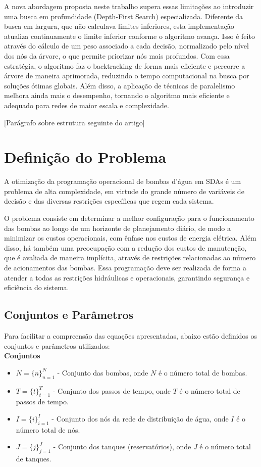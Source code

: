 \documentclass[12pt,a4paper,oneside,linenumbers=off,latinmodern=off,timesnews=off,english,spanish]{rctart-class/rctart}
\begin{document}
A nova abordagem proposta neste trabalho supera essas limitações ao introduzir uma busca em profundidade (Depth-First Search) especializada. Diferente da busca em largura, que não calculava limites inferiores, esta implementação atualiza continuamente o limite inferior conforme o algoritmo avança. Isso é feito através do cálculo de um peso associado a cada decisão, normalizado pelo nível dos nós da árvore, o que permite priorizar nós mais profundos. Com essa estratégia, o algoritmo faz o backtracking de forma mais eficiente e percorre a árvore de maneira aprimorada, reduzindo o tempo computacional na busca por soluções ótimas globais. Além disso, a aplicação de técnicas de paralelismo melhora ainda mais o desempenho, tornando o algoritmo mais eficiente e adequado para redes de maior escala e complexidade.

[Parágrafo sobre estrutura seguinte do artigo]


\section{Definição do Problema}

A otimização da programação operacional de bombas d'água em SDAs é um problema de alta complexidade, em virtude do grande número de variáveis de decisão e das diversas restrições específicas que regem cada sistema.

O problema consiste em determinar a melhor configuração para o funcionamento das bombas ao longo de um horizonte de planejamento diário, de modo a minimizar os custos operacionais, com ênfase nos custos de energia elétrica. Além disso, há também uma preocupação com a redução dos custos de manutenção, que é avaliada de maneira implícita, através de restrições relacionadas ao número de acionamentos das bombas. Essa programação deve ser realizada de forma a atender a todas as restrições hidráulicas e operacionais, garantindo segurança e eficiência do sistema.

\subsection{Conjuntos e Parâmetros}

Para facilitar a compreensão das equações apresentadas, abaixo estão definidos os conjuntos e parâmetros utilizados:
\\


\textbf{Conjuntos}
\begin{itemize}
    \item \( N = \{n\}_{n=1}^{N} \) - Conjunto das bombas, onde \(N\) é o número total de bombas.
    \item \( T = \{t\}_{t=1}^{T} \) - Conjunto dos passos de tempo, onde \(T\) é o número total de passos de tempo.
    \item \( I = \{i\}_{i=1}^{I} \) - Conjunto dos nós da rede de distribuição de água, onde \(I\) é o número total de nós.
    \item \( J = \{j\}_{j=1}^{J} \) - Conjunto dos tanques (reservatórios), onde \(J\) é o número total de tanques.
\end{itemize}
\end{document}
